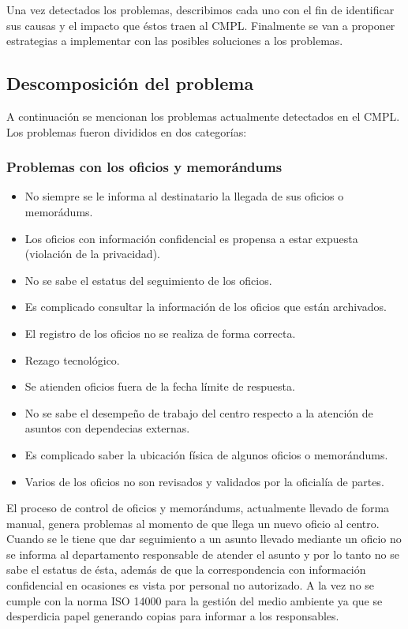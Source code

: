 Una vez detectados los problemas, describimos cada uno con el fin de identificar sus causas y el impacto que éstos traen al CMPL. Finalmente se van a proponer estrategias a implementar con las posibles soluciones a los problemas. 
	\subsection{Descomposición del problema}
	A continuación se mencionan los problemas actualmente detectados en el CMPL. Los problemas fueron divididos en dos categorías:
	
		\subsubsection{Problemas con los oficios y memorándums}
\begin{itemize}
	\item No siempre se le informa al destinatario la llegada de sus oficios o memorádums.
	\item Los oficios con información confidencial es propensa a estar expuesta (violación de la privacidad).
	\item No se sabe el estatus del seguimiento de los oficios.
	\item Es complicado consultar la información de los oficios que están archivados.
	\item El registro de los oficios no se realiza de forma correcta.
	\item Rezago tecnológico.
	\item Se atienden oficios fuera de la fecha límite de respuesta.
	\item No se sabe el desempeño de trabajo del centro respecto a la atención de asuntos con dependecias externas.
	\item Es complicado saber la ubicación física de algunos oficios o memorándums. %
	\item Varios de los oficios no son revisados y validados por la oficialía de partes.
	\end{itemize}
El proceso de control de oficios y memorándums, actualmente llevado de forma manual, genera problemas al momento de que llega un nuevo oficio al centro. Cuando se le tiene que dar seguimiento a un asunto llevado mediante un oficio no se informa al departamento responsable de atender el asunto y por lo tanto no se sabe el estatus de ésta, además de que la correspondencia con información confidencial en ocasiones es vista por personal no autorizado. A la vez no se cumple con la norma ISO 14000 para la gestión del medio ambiente ya que se desperdicia papel generando copias para informar a los responsables.

